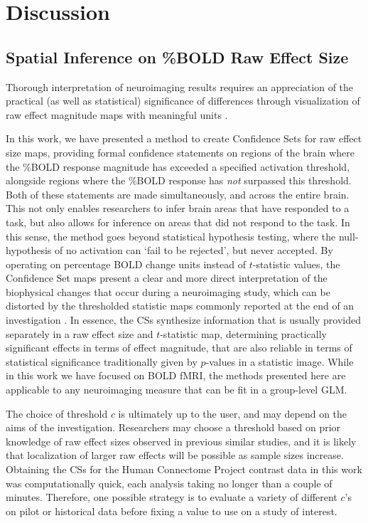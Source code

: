\section{Discussion}
\subsection{Spatial Inference on \%BOLD Raw Effect Size}
\label{sec:discussion_inference}
Thorough interpretation of neuroimaging results requires an appreciation of the practical (as well as statistical) significance of differences through visualization of raw effect magnitude maps with meaningful units \citep{Chen2017-sb}.

In this work, we have presented a method to create Confidence Sets for raw effect size maps, providing formal confidence statements on regions of the brain where the \%BOLD response magnitude has exceeded a specified activation threshold, alongside regions where the \%BOLD response has \textit{not} surpassed this threshold. Both of these statements are made simultaneously, and across the entire brain. This not only enables researchers to infer brain areas that have responded to a task, but also allows for inference on areas that did not respond to the task. In this sense, the method goes beyond statistical hypothesis testing, where the null-hypothesis of no activation can `fail to be rejected', but never accepted. By operating on percentage BOLD change units instead of $t$-statistic values, the Confidence Set maps present a clear and more direct interpretation of the biophysical changes that occur during a neuroimaging study, which can be distorted by the thresholded statistic maps commonly reported at the end of an investigation \citep{Engel2013-nq}. In essence, the CSs synthesize information that is usually provided separately in a raw effect size and $t$-statistic map, determining practically significant effects in terms of effect magnitude, that are also reliable in terms of statistical significance traditionally given by $p$-values in a statistic image. While in this work we have focused on BOLD fMRI, the methods presented here are applicable to any neuroimaging measure that can be fit in a group-level GLM.

The choice of threshold $c$ is ultimately up to the user, and may depend on the aims of the investigation. Researchers may choose a threshold based on prior knowledge of raw effect sizes observed in previous similar studies, and it is likely that localization of larger raw effects will be possible as sample sizes increase. Obtaining the CSs for the Human Connectome Project contrast data in this work was computationally quick, each analysis taking no longer than a couple of minutes. Therefore, one possible strategy is to evaluate a variety of different $c$'s on pilot or historical data before fixing a value to use on a study of interest.

